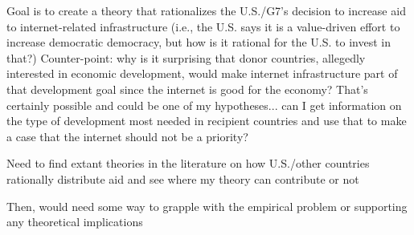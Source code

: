 Goal is to create a theory that rationalizes the U.S./G7's decision to increase aid to internet-related infrastructure (i.e., the U.S. says it is a value-driven effort to increase democratic democracy, but how is it rational for the U.S. to invest in that?) Counter-point: why is it surprising that donor countries, allegedly interested in economic development, would make internet infrastructure part of that development goal since the internet is good for the economy? That's certainly possible and could be one of my hypotheses... can I get information on the type of development most needed in recipient countries and use that to make a case that the internet should not be a priority?

Need to find extant theories in the literature on how U.S./other countries rationally distribute aid and see where my theory can contribute or not

Then, would need some way to grapple with the empirical problem or supporting any theoretical implications